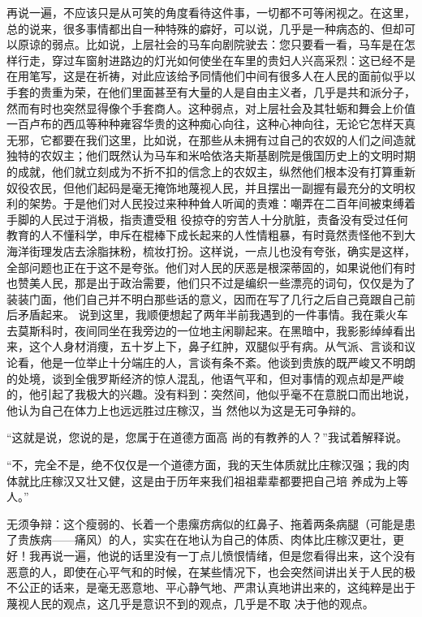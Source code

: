 \documentclass{article}
\begin{document}
\newpage
再说一遍，不应该只是从可笑的角度看待这件事，一切都不可等闲视之。在这里，总的说来，很多事情都出自一种特殊的癖好，可以说，几乎是一种病态的、但却可以原谅的弱点。比如说，上层社会的马车向剧院驶去：您只要看一看，马车是在怎样行走，穿过车窗射进路边的灯光如何使坐在车里的贵妇人兴高采烈：这已经不是在用笔写，这是在祈祷，对此应该给予同情他们中间有很多人在人民的面前似乎以手套的贵重为荣，在他们里面甚至有大量的人是自由主义者，几乎是共和派分子，然而有时也突然显得像个手套商人。这种弱点，对上层社会及其牡蛎和舞会上价值一百卢布的西瓜等种种雍容华贵的这种痴心向往，这种心神向往，无论它怎样天真无邪，它都要在我们这里，比如说，在那些从未拥有过自己的农奴的人们之间造就独特的农奴主；他们既然认为马车和米哈依洛夫斯基剧院是俄国历史上的文明时期的成就，他们就立刻成为不折不扣的信念上的农奴主，纵然他们根本没有打算重新奴役农民，但他们起码是毫无掩饰地蔑视人民，并且摆出一副握有最充分的文明权利的架势。于是他们对人民投过来种种耸人听闻的责难：嘲弄在二百年间被束缚着手脚的人民过于消极，指责遭受租
\newpage
役掠夺的穷苦人十分肮脏，责备没有受过任何教育的人不懂科学，申斥在棍棒下成长起来的人性情粗暴，有时竟然责怪他不到大海洋街理发店去涂脂抹粉，梳妆打扮。这样说，一点儿也没有夸张，确实是这样，全部问题也正在于这不是夸张。他们对人民的厌恶是根深蒂固的，如果说他们有时也赞美人民，那是出于政治需要，他们只不过是编织一些漂亮的词句，仅仅是为了装装门面，他们自己并不明白那些话的意义，因而在写了几行之后自己竟跟自己前后矛盾起来。
说到这里，我顺便想起了两年半前我遇到的一件事情。我在乘火车去莫斯科时，夜间同坐在我旁边的一位地主闲聊起来。在黑暗中，我影影绰绰看出来，这个人身材消痩，五十岁上下，鼻子红肿，双腿似乎有病。从气派、言谈和议论看，他是一位举止十分端庄的人，言谈有条不紊。他谈到贵族的既严峻又不明朗的处境，谈到全俄罗斯经济的惊人混乱，他语气平和，但对事情的观点却是严峻的，他引起了我极大的兴趣。没有料到：突然间，他似乎毫不在意脱口而出地说，他认为自己在体力上也远远胜过庄稼汉，当
然他以为这是无可争辩的。 

\newpage

“这就是说，您说的是，您属于在道德方面高
尚的有教养的人？”我试着解释说。 

“不，完全不是，绝不仅仅是一个道德方面，我的天生体质就比庄稼汉强；我的肉体就比庄稼汉又壮又健，这是由于历年来我们祖祖辈辈都要把自己培
养成为上等人。” 

无须争辩：这个瘦弱的、长着一个患瘰疠病似的红鼻子、拖着两条病腿（可能是患了贵族病——痛风）的人，实实在在地认为自己的体质、肉体比庄稼汉更壮，更好！我再说一遍，他说的话里没有一丁点儿愤恨情绪，但是您看得出来，这个没有恶意的人，即使在心平气和的时候，在某些情况下，也会突然间讲出关于人民的极不公正的话来，是毫无恶意地、平心静气地、严肃认真地讲出来的，这纯粹是出于蔑视人民的观点，这几乎是意识不到的观点，几乎是不取
决于他的观点。 
\end{document}
